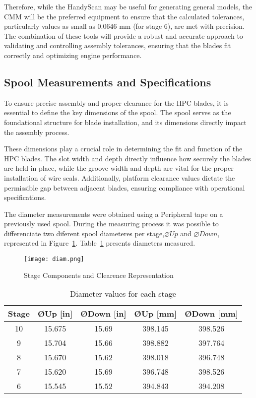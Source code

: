 Therefore, while the HandyScan may be useful for generating general models, the CMM will be the preferred equipment to ensure that the calculated tolerances, particularly values as small as 0.0646 mm (for stage 6), are met with precision. The combination of these tools will provide a robust and accurate approach to validating and controlling assembly tolerances, ensuring that the blades fit correctly and optimizing engine performance.

\subsection{Spool Measurements and Specifications}
\label{subsec:spool_measurements}

To ensure precise assembly and proper clearance for the HPC blades, it is essential to define the key dimensions of the spool. The spool serves as the foundational structure for blade installation, and its dimensions directly impact the assembly process. 

These dimensions play a crucial role in determining the fit and function of the HPC blades. The slot width and depth directly influence how securely the blades are held in place, while the groove width and depth are vital for the proper installation of wire seals.
Additionally, platform clearance values dictate the permissible gap between adjacent blades, ensuring compliance with operational specifications.

The diameter measurements were obtained using a Peripheral tape on a previously used spool. 
During the measuring process it was possible to differenciate two diferent spool diameteres per stage,$\varnothing Up$ and $\varnothing Down$, represented in Figure~\ref{fig:diam.png}.
Table~\ref{tab:diameters} presents diameters measured.

\begin{figure}[H]
    \centering
    \texttt{[image: diam.png]}
    \caption{Stage Components and Clearence Representation}
    \label{fig:diam.png}
\end{figure}


\begin{table}[h]
    \centering
    \begin{tabular}{|c|c|c|c|c|}
        \hline
        Stage & ØUp [in] & ØDown [in] & ØUp [mm] & ØDown [mm]\\
        \hline
        10 & 15.675 & 15.69 & 398.145 & 398.526 \\
        9  & 15.704 & 15.66 & 398.882 & 397.764 \\
        8  & 15.670 & 15.62 & 398.018 & 396.748 \\
        7  & 15.620 & 15.69 & 396.748 & 398.526 \\
        6  & 15.545 & 15.52 & 394.843 & 394.208 \\
        \hline
    \end{tabular}
    \caption{Diameter values for each stage}
    \label{tab:diameters}
\end{table}

